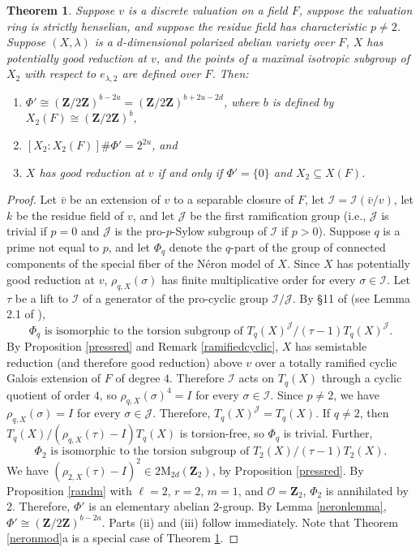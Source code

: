 \documentclass{amsart}
\def\Z{{\mathbf Z}}
\def\I{{\mathcal I}}
\def\J{{\mathcal J}}
\def\M{\mathrm{M}}
\def\O{{\mathcal O}}
\newtheorem{thm}{Theorem}[section]
\theoremstyle{definition}
\begin{document}
\begin{thm}
\label{neron}
Suppose $v$ is a discrete valuation on a field $F$, suppose
the valuation ring is strictly henselian, and suppose the residue field
has characteristic $p \ne 2$.
Suppose $(X, \lambda)$ is a $d$-dimensional polarized abelian 
variety over $F$, $X$ has potentially good reduction at $v$, and
the points of a maximal isotropic subgroup of $X_2$ with respect to 
$e_{\lambda,2}$ are defined over $F$.
Then:
\begin{enumerate}
\item[(i)]  $\Phi' \cong (\Z/2\Z)^{b-2a} = (\Z/2\Z)^{b+2u-2d}$, 
where $b$ is defined by $X_2(F) \cong (\Z/2\Z)^{b}$,
\item[(ii)]  $[X_2 : X_2(F)]\#\Phi' = 2^{2u}$, and
\item[(iii)]  $X$ has good reduction at $v$ if and only if
$\Phi' = \{0\}$ and $X_2 \subseteq X(F)$.
\end{enumerate}
\end{thm}

\begin{proof}
Let ${\bar v}$ be an extension of $v$ to a separable closure of $F$,
let $\I = \I({\bar v}/v)$, let $k$ be the residue field of $v$, and
let $\J$ be the first ramification group (i.e., $\J$ is trivial if
$p = 0$ and $\J$ is the pro-$p$-Sylow subgroup of $\I$ if $p > 0$). 
Suppose $q$ is a prime not equal to $p$, and let
$\Phi_q$ denote the $q$-part of the
group of connected components of the special
fiber of the N\'eron model of $X$. 
Since $X$ has potentially good reduction at $v$, $\rho_{q,X}(\sigma)$
has finite multiplicative order for every $\sigma \in \I$. 
Let $\tau$ be a lift to $\I$ of a generator of the pro-cyclic group
$\I/\J$. By \S11 of \cite{SGA} (see Lemma 2.1 of \cite{Lorenzini}), 
$$\Phi_q \text{ is isomorphic to the torsion subgroup of } 
T_q(X)^\J/(\tau - 1)T_q(X)^\J.$$
By Proposition \ref{pressred} and Remark \ref{ramifiedcyclic}, 
$X$ has semistable reduction (and therefore good reduction) above $v$ over 
a totally ramified cyclic Galois extension of $F$ of degree $4$. Therefore
$\I$ acts on $T_q(X)$ through a cyclic quotient of order $4$, so
$\rho_{q,X}(\sigma)^4 = I$ for every $\sigma \in \I$. Since $p \ne 2$,
we have $\rho_{q,X}(\sigma) = I$ for every $\sigma \in \J$. Therefore,
$T_q(X)^\J = T_q(X)$. If $q \ne 2$, then 
$T_q(X)/(\rho_{q,X}(\tau) - I)T_q(X)$
is torsion-free, so $\Phi_q$ is trivial. Further,
$$\Phi_2 \text{ is isomorphic to the torsion subgroup of } 
T_2(X)/(\tau - 1)T_2(X).$$ 
We have $(\rho_{2,X}(\tau) - I)^2 \in 2\M_{2d}(\Z_2)$, by Proposition \ref{pressred}.
By Proposition \ref{randm} with $\ell = 2$, $r = 2$, $m = 1$, and $\O = \Z_2$, 
$\Phi_2$ is annihilated by $2$.
Therefore, $\Phi'$ is an elementary abelian $2$-group.
By Lemma \ref{neronlemma},  $\Phi' \cong (\Z/2\Z)^{b-2a}$.
Parts (ii) and (iii) follow immediately.
Note that Theorem \ref{neronmod}a is a special case of Theorem
\ref{neron}.
\end{proof}
\end{document}
